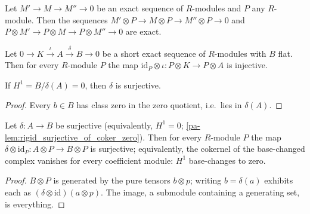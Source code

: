 \begin{lemma}
  \label{pa-lem:tensor_right_exact}
  \mathlibok

  Let \(M' \to M \to M'' \to 0\) be an exact sequence of \(R\)-modules and \(P\) any
  \(R\)-module. Then the sequences
  \(M' \otimes P \to M \otimes P \to M'' \otimes P \to 0\) and
  \(P \otimes M' \to P \otimes M \to P \otimes M'' \to 0\) are exact.
\end{lemma}

\begin{lemma}
  \label{pa-lem:lTensor_injective_of_flat}
  \mathlibok

  Let \(0 \to K \xrightarrow{\iota} A \xrightarrow{\delta} B \to 0\) be a short exact
  sequence of \(R\)-modules with \(B\) flat. Then for every \(R\)-module \(P\) the map
  \(\mathrm{id}_P \otimes \iota : P \otimes K \to P \otimes A\) is injective.
\end{lemma}

\begin{lemma}
  \label{pa-lem:rigid_surjective_of_coker_zero}
  \leanok

  If \(H^1 = B/\delta(A) = 0\), then \(\delta\) is surjective.
\end{lemma}
\begin{proof}
  \leanok
  Every \(b \in B\) has class zero in the zero quotient, i.e.\ lies in \(\delta(A)\).
\end{proof}

\begin{lemma}
  \label{pa-lem:rigid_coker_tensor_zero}
  \leanok

  Let \(\delta : A \to B\) be surjective (equivalently, \(H^1 = 0\);
  \ref{pa-lem:rigid_surjective_of_coker_zero}). Then for every \(R\)-module \(P\) the map
  \(\delta \otimes \mathrm{id}_P : A \otimes P \to B \otimes P\) is surjective;
  equivalently, the cokernel of the base-changed complex vanishes for every coefficient
  module: \(H^1\) base-changes to zero.
\end{lemma}
\begin{proof}
  \leanok
  \(B \otimes P\) is generated by the pure tensors \(b \otimes p\); writing
  \(b = \delta(a)\) exhibits each as
  \((\delta \otimes \mathrm{id})(a \otimes p)\). The image, a submodule containing a
  generating set, is everything.
\end{proof}


